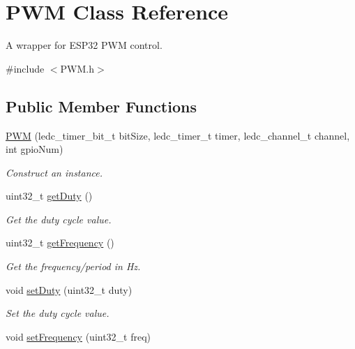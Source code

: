 \hypertarget{class_p_w_m}{}\section{P\+WM Class Reference}
\label{class_p_w_m}


A wrapper for E\+S\+P32 P\+WM control.  




{\ttfamily \#include $<$P\+W\+M.\+h$>$}

\subsection*{Public Member Functions}
\begin{DoxyCompactItemize}
\item 
\hyperlink{class_p_w_m_ad2d67d2ed4c65173889a7528ff4d2fa4}{P\+WM} (ledc\+\_\+timer\+\_\+bit\+\_\+t bit\+Size, ledc\+\_\+timer\+\_\+t timer, ledc\+\_\+channel\+\_\+t channel, int gpio\+Num)
\begin{DoxyCompactList}\small\item\em Construct an instance. \end{DoxyCompactList}\item 
uint32\+\_\+t \hyperlink{class_p_w_m_a7d6403597b936f73be3a53b330d15f52}{get\+Duty} ()
\begin{DoxyCompactList}\small\item\em Get the duty cycle value. \end{DoxyCompactList}\item 
uint32\+\_\+t \hyperlink{class_p_w_m_a70e2e1ad7736f241eef020ec4c7e7fff}{get\+Frequency} ()
\begin{DoxyCompactList}\small\item\em Get the frequency/period in Hz. \end{DoxyCompactList}\item 
void \hyperlink{class_p_w_m_adae9be9a8c34c42d0f81dd0b4a24c14f}{set\+Duty} (uint32\+\_\+t duty)\hypertarget{class_p_w_m_adae9be9a8c34c42d0f81dd0b4a24c14f}{}\label{class_p_w_m_adae9be9a8c34c42d0f81dd0b4a24c14f}

\begin{DoxyCompactList}\small\item\em Set the duty cycle value. \end{DoxyCompactList}\item 
void \hyperlink{class_p_w_m_a51543c5bf29d9f3ae83c7f5af176895d}{set\+Frequency} (uint32\+\_\+t freq)\hypertarget{class_p_w_m_a51543c5bf29d9f3ae83c7f5af176895d}{}\label{class_p_w_m_a51543c5bf29d9f3ae83c7f5af176895d}


\end{DoxyCompactItemize}
